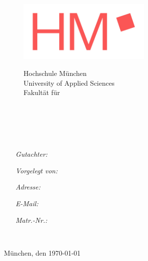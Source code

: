 
\begin{titlepage}

\begin{center}

\begin{figure}[htbp]
\begin{minipage}[t]{7cm}
\vspace{0pt}
\centering
\includegraphics[height=3cm]{source/images/hmlogo}	
\end{minipage}
\hfill
\begin{minipage}[t]{7cm}
\vspace{0.6cm}
\textcolor{hmred}{Hochschule M\"unchen \\
University of Applied Sciences \\
Fakult\"at f\"ur \\ \Fachbereich}
\end{minipage}
\end{figure}

\vspace{1.5cm}
\textsc{\Large \Labor}\\[1.5cm]

\HRule\\[0.8cm]
{ \huge \bfseries \TitelArbeit}\\[0.2cm]
\HRule \\[1.5cm]

\begin{minipage}[t]{\textwidth}
	\begin{itemize}[labelwidth={1em}]
	\setlength\itemsep{-0.3em}
	\item[\emph{Gutachter:}] \Prof 
	\item[\emph{Vorgelegt von:}] \Author
	\item[\emph{Adresse:}] \Strasse
	\item[] \Stadt
	\item[\emph{E-Mail:}] \Email
	\item[\emph{Matr.-Nr.:}] \Matrikelnummer
	\end{itemize}
\end{minipage} \\[0.9cm]

\begin{flushright}
	M\"unchen, den \today
\end{flushright}

\end{center}
\end{titlepage}

